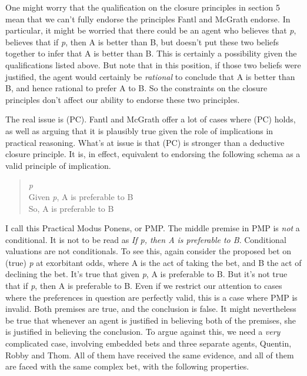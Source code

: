 \documentclass[
  10pt,
  letterpaper,
  DIV=11,
  numbers=noendperiod,
  twoside]{scrartcl}
\begin{document}
One might worry that the qualification on the closure principles in
section 5 mean that we can't fully endorse the principles Fantl and
McGrath endorse. In particular, it might be worried that there could be
an agent who believes that \emph{p}, believes that if \emph{p}, then A
is better than B, but doesn't put these two beliefs together to infer
that A is better than B. This is certainly a possibility given the
qualifications listed above. But note that in this position, if those
two beliefs were justified, the agent would certainly be \emph{rational}
to conclude that A is better than B, and hence rational to prefer A to
B. So the constraints on the closure principles don't affect our ability
to endorse these two principles.

The real issue is (PC). Fantl and McGrath offer a lot of cases where
(PC) holds, as well as arguing that it is plausibly true given the role
of implications in practical reasoning. What's at issue is that (PC) is
stronger than a deductive closure principle. It is, in effect,
equivalent to endorsing the following schema as a valid principle of
implication.

\begin{quote}
\emph{p}\\
Given \emph{p}, A is preferable to B\\
So, A is preferable to B
\end{quote}

I call this Practical Modus Ponens, or PMP. The middle premise in PMP is
\emph{not} a conditional. It is not to be read as \emph{If p, then A is
preferable to B}. Conditional valuations are not conditionals. To see
this, again consider the proposed bet on (true) \emph{p} at exorbitant
odds, where A is the act of taking the bet, and B the act of declining
the bet. It's true that given \emph{p}, A is preferable to B. But it's
not true that if \emph{p}, then A is preferable to B. Even if we
restrict our attention to cases where the preferences in question are
perfectly valid, this is a case where PMP is invalid. Both premises are
true, and the conclusion is false. It might nevertheless be true that
whenever an agent is justified in believing both of the premises, she is
justified in believing the conclusion. To argue against this, we need a
\emph{very} complicated case, involving embedded bets and three separate
agents, Quentin, Robby and Thom. All of them have received the same
evidence, and all of them are faced with the same complex bet, with the
following properties.
\end{document}
